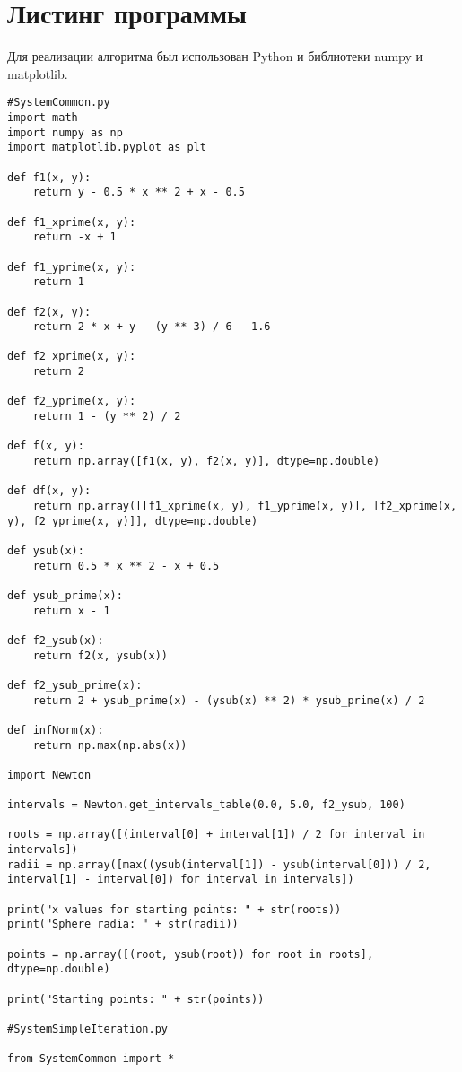 \documentclass[14pt, a4paper]{article}
\begin{document}
  \section{Листинг программы}
  Для реализации алгоритма был использован Python и библиотеки numpy и matplotlib.

\begin{lstlisting}
#SystemCommon.py
import math
import numpy as np
import matplotlib.pyplot as plt

def f1(x, y):
    return y - 0.5 * x ** 2 + x - 0.5

def f1_xprime(x, y):
    return -x + 1

def f1_yprime(x, y):
    return 1

def f2(x, y):
    return 2 * x + y - (y ** 3) / 6 - 1.6

def f2_xprime(x, y):
    return 2

def f2_yprime(x, y):
    return 1 - (y ** 2) / 2

def f(x, y):
    return np.array([f1(x, y), f2(x, y)], dtype=np.double)

def df(x, y):
    return np.array([[f1_xprime(x, y), f1_yprime(x, y)], [f2_xprime(x, y), f2_yprime(x, y)]], dtype=np.double)

def ysub(x):
    return 0.5 * x ** 2 - x + 0.5

def ysub_prime(x):
    return x - 1

def f2_ysub(x):
    return f2(x, ysub(x))

def f2_ysub_prime(x):
    return 2 + ysub_prime(x) - (ysub(x) ** 2) * ysub_prime(x) / 2

def infNorm(x):
    return np.max(np.abs(x))

import Newton

intervals = Newton.get_intervals_table(0.0, 5.0, f2_ysub, 100)

roots = np.array([(interval[0] + interval[1]) / 2 for interval in intervals])
radii = np.array([max((ysub(interval[1]) - ysub(interval[0])) / 2, interval[1] - interval[0]) for interval in intervals])

print("x values for starting points: " + str(roots))
print("Sphere radia: " + str(radii))

points = np.array([(root, ysub(root)) for root in roots], dtype=np.double)

print("Starting points: " + str(points))

#SystemSimpleIteration.py

from SystemCommon import *


\end{lstlisting}
\end{document}
